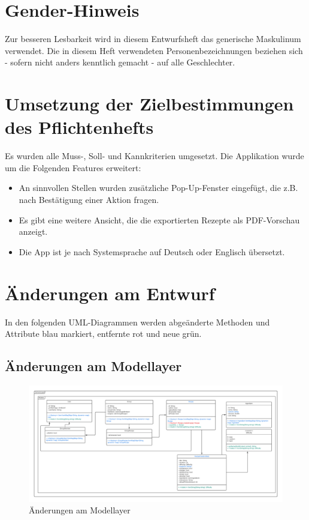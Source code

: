 \documentclass{implementierungsheft}
\begin{document}

\maketitle
\tableofcontents
\newpage

\section*{Gender-Hinweis}
Zur besseren Lesbarkeit wird in diesem Entwurfsheft das generische Maskulinum verwendet.
Die in diesem Heft verwendeten Personenbezeichnungen beziehen sich - sofern nicht anders kenntlich gemacht - auf alle Geschlechter.
\newpage

\section{Umsetzung der Zielbestimmungen des Pflichtenhefts}
Es wurden alle Muss-, Soll- und Kannkriterien umgesetzt. Die Applikation wurde um die Folgenden Features erweitert:
\begin{itemize}
    \item An sinnvollen Stellen wurden zusätzliche Pop-Up-Fenster eingefügt, die z.B. nach Bestätigung einer Aktion fragen.
    \item Es gibt eine weitere Ansicht, die die exportierten Rezepte als PDF-Vorschau anzeigt.
    \item Die App ist je nach Systemsprache auf Deutsch oder Englisch übersetzt.
\end{itemize}
\newpage
\section{Änderungen am Entwurf}
In den folgenden UML-Diagrammen werden abgeänderte Methoden und Attribute blau markiert, entfernte rot und neue grün.
\subsection{Änderungen am Modellayer}
\begin{figure}[htp]
    \centering
    \includegraphics[width=\textwidth]{images/uml/modelLayer.pdf}
    \caption{Änderungen am Modellayer}
    \label{fig:modellayer}
\end{figure}
\end{document}
